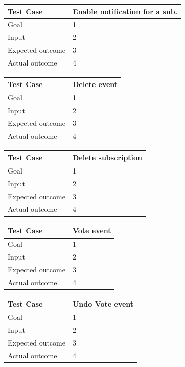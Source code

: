 \documentclass[a4paper]{scrreprt}
\begin{document}
\bigskip
\noindent
\begin{tabularx}{\linewidth}{|l|X|}
	\hline
	\textbf{Test Case} 	& \textbf{Enable notification for a sub.} \\ \hline
	Goal 				& 1 \\ \hline
	Input 				& 2 \\ \hline
	Expected outcome 	& 3 \\ \hline
	Actual outcome 		& 4 \\ \hline
\end{tabularx}
\bigskip
\noindent
\begin{tabularx}{\linewidth}{|l|X|}
	\hline
	\textbf{Test Case} 	& \textbf{Delete event} \\ \hline
	Goal 				& 1 \\ \hline
	Input 				& 2 \\ \hline
	Expected outcome 	& 3 \\ \hline
	Actual outcome 		& 4 \\ \hline
\end{tabularx}
\bigskip
\noindent
\begin{tabularx}{\linewidth}{|l|X|}
	\hline
	\textbf{Test Case} 	& \textbf{Delete subscription} \\ \hline
	Goal 				& 1 \\ \hline
	Input 				& 2 \\ \hline
	Expected outcome 	& 3 \\ \hline
	Actual outcome 		& 4 \\ \hline
\end{tabularx}
\bigskip
\noindent
\begin{tabularx}{\linewidth}{|l|X|}
	\hline
	\textbf{Test Case} 	& \textbf{Vote event} \\ \hline
	Goal 				& 1 \\ \hline
	Input 				& 2 \\ \hline
	Expected outcome 	& 3 \\ \hline
	Actual outcome 		& 4 \\ \hline
\end{tabularx}
\bigskip
\noindent
\begin{tabularx}{\linewidth}{|l|X|}
	\hline
	\textbf{Test Case} 	& \textbf{Undo Vote event} \\ \hline
	Goal 				& 1 \\ \hline
	Input 				& 2 \\ \hline
	Expected outcome 	& 3 \\ \hline
	Actual outcome 		& 4 \\ \hline
\end{tabularx}
\end{document}
